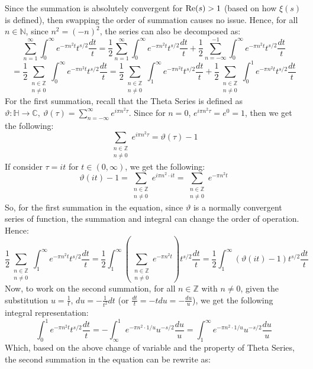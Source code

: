 \documentclass{article}
\begin{document}
Since the summation is absolutely convergent for $\textmd{Re}(s)>1$ (based on how $\xi(s)$ is defined), then swapping the order of summation causes no issue. Hence, for all $n\in\mathbb{N}$, since $n^2=(-n)^2$, the series can also be decomposed as:
$$\sum_{n=1}^{\infty}\int_{0}^{\infty}e^{-\pi n^2t}t^{s/2}\frac{dt}{t} = \frac{1}{2}\sum_{n=1}^{\infty}\int_{0}^{\infty}e^{-\pi n^2t}t^{s/2}\frac{dt}{t}+\frac{1}{2}\sum_{n=-\infty}^{-1}\int_{0}^{\infty}e^{-\pi n^2t}t^{s/2}\frac{dt}{t}$$
$$= \frac{1}{2}\sum_{\substack{n\in\mathbb{Z}\\n\neq 0}}\int_{0}^{\infty}e^{-\pi n^2t}t^{s/2}\frac{dt}{t} =\frac{1}{2}\sum_{\substack{n\in\mathbb{Z}\\n\neq 0}}\int_{1}^{\infty}e^{-\pi n^2t}t^{s/2}\frac{dt}{t}+\frac{1}{2}\sum_{\substack{n\in\mathbb{Z}\\n\neq 0}}\int_{0}^{1}e^{-\pi n^2t}t^{s/2}\frac{dt}{t}$$
For the first summation, recall that the Theta Series is defined as $\vartheta:\mathbb{H}\rightarrow\mathbb{C},\ \vartheta(\tau) = \sum_{n=-\infty}^{\infty}e^{i\pi n^2\tau}$.
Since for $n=0$, $e^{i\pi n^2\tau} = e^0=1$, then we get the following:
$$\sum_{\substack{n\in\mathbb{Z}\\n\neq 0}}e^{i\pi n^2\tau} = \vartheta(\tau)-1$$
If consider $\tau=it$ for $t\in(0,\infty)$, we get the following:
$$\vartheta(it)-1 = \sum_{\substack{n\in\mathbb{Z}\\n\neq 0}}e^{i\pi n^2\cdot it} = \sum_{\substack{n\in\mathbb{Z}\\n\neq 0}}e^{-\pi n^2t}$$
So, for the first summation in the equation, since $\vartheta$ is a normally convergent series of function, the summation and integral can change the order of operation. Hence:
$$\frac{1}{2}\sum_{\substack{n\in\mathbb{Z}\\n\neq 0}}\int_{1}^{\infty}e^{-\pi n^2t}t^{s/2}\frac{dt}{t} = \frac{1}{2}\int_{1}^{\infty}\left(\sum_{\substack{n\in\mathbb{Z}\\n\neq 0}}e^{-\pi n^2t}\right)t^{s/2}\frac{dt}{t} = \frac{1}{2}\int_{1}^{\infty}(\vartheta(it)-1)t^{s/2}\frac{dt}{t}$$
Now, to work on the second summation, for all $n\in\mathbb{Z}$ with $n\neq 0$, given the substitution $u=\frac{1}{t}$, $du=-\frac{1}{t^2}dt$ (or $\frac{dt}{t}=-tdu = -\frac{du}{u}$), we get the following integral representation:
$$\int_{0}^{1}e^{-\pi n^2t}t^{s/2}\frac{dt}{t} = -\int_{\infty}^{1}e^{-\pi n^2\cdot 1/u}u^{-s/2}\frac{du}{u} = \int_{1}^{\infty}e^{-\pi n^2\cdot 1/u}u^{-s/2}\frac{du}{u}$$
Which, based on the above change of variable and the property of Theta Series, the second summation in the equation can be rewrite as:
\end{document}
